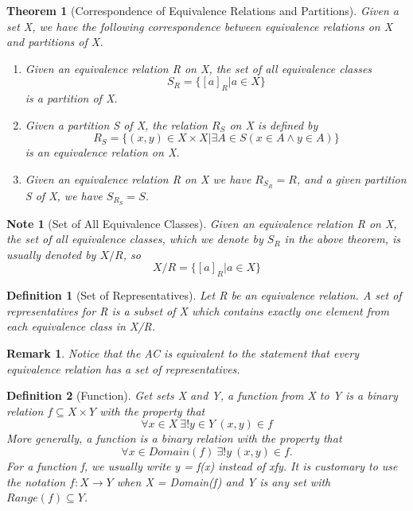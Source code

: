 \documentclass[11pt, oneside]{book}
\theoremstyle{break}
\newtheorem{thm}{Theorem}[section]
\newtheorem*{remark}{Remark}
\newtheorem*{note}{Note}
\newtheorem{defn}{Definition}[section]
\begin{document}
\begin{thm}[Correspondence of Equivalence Relations and Partitions]
	Given a set X, we have the following correspondence between equivalence relations on X and partitions of X.
	\begin{enumerate}
		\item Given an equivalence relation R on X, the set of all equivalence classes
		\[
			S_R = \{[a]_R | a \in X\}
		\] is a partition of X.
		\item Given a partition S of X, the relation $R_S$ on X is defined by
		\[
			R_S = \{(x, y) \in X \times X | \exists A \in S (x \in A \land y \in A)\}
		\] is an equivalence relation on X.
		\item Given an equivalence relation R on X we have $R_{S_R} = R$, and a given partition S of X, we have $S_{R_S} = S$.
	\end{enumerate}
\end{thm}

\begin{note}[Set of All Equivalence Classes]
	Given an equivalence relation R on X, the set of all equivalence classes, which we denote by $S_R$ in the above theorem, is usually denoted by $X/R$, so
	\[
		X/R = \{[a]_R | a \in X\}
	\]
\end{note}

\begin{defn}[Set of Representatives]
	Let R be an equivalence relation. A set of representatives for R is a subset of X which contains exactly one element from each equivalence class in X/R.
\end{defn}

\begin{remark}
	Notice that the AC is equivalent to the statement that every equivalence relation has a set of representatives.
\end{remark}

\begin{defn}[Function]\label{fn_apdxA}
	Get sets X and Y, a function from X to Y is a binary relation $f \subseteq X \times Y$ with the property that
	\[
		\forall x \in X \> \exists! y \in Y \> (x,y) \in f
	\]
	More generally, a function is a binary relation with the property that
	\[
		\forall x \in Domain(f) \> \exists! y \> (x, y) \in f.
	\]
	For a function f, we usually write y = f(x) instead of xfy. It is customary to use the notation $f: X \to Y$ when X = Domain(f) and Y is any set with $Range(f) \subseteq Y$.
\end{defn}
\end{document}
